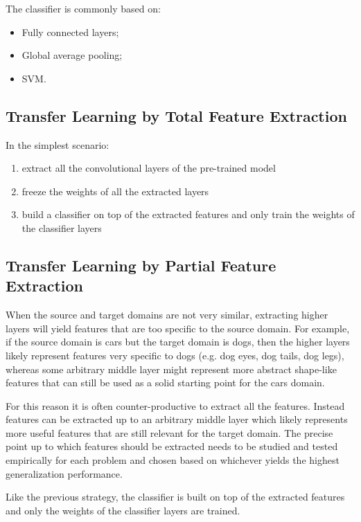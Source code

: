 The classifier is commonly based on:

\begin{itemize}
    \item Fully connected layers;
    \item Global average pooling;
    \item SVM.
\end{itemize}

\subsection{Transfer Learning by Total Feature Extraction}

In the simplest scenario:

\begin{enumerate}
    \item extract all the convolutional layers of the pre-trained model
    \item freeze the weights of all the extracted layers
    \item build a classifier on top of the extracted features and only train the weights of the classifier layers
\end{enumerate}

\subsection{Transfer Learning by Partial Feature Extraction}

When the source and target domains are not very similar, extracting higher layers will yield features that are too specific to the source domain. For example, if the source domain is cars but the target domain is dogs, then the higher layers likely represent features very specific to dogs (e.g. dog eyes, dog tails, dog legs), whereas some arbitrary middle layer might represent more abstract shape-like features that can still be used as a solid starting point for the cars domain.

For this reason it is often counter-productive to extract all the features. Instead features can be extracted up to an arbitrary middle layer which likely represents more useful features that are still relevant for the target domain. The precise point up to which features should be extracted needs to be studied and tested empirically for each problem and chosen based on whichever yields the highest generalization performance.

Like the previous strategy, the classifier is built on top of the extracted features and only the weights of the classifier layers are trained.

